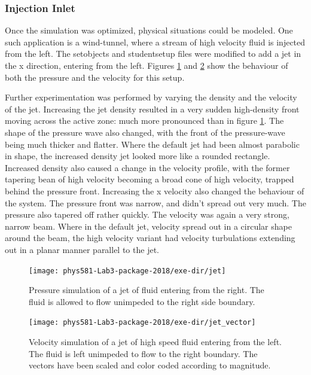 \documentclass[twocolumn]{article}
\begin{document}
\subsubsection{Injection Inlet}
Once the simulation was optimized, physical situations could be modeled. One such application is a wind-tunnel, where a stream of high velocity fluid is injected from the left. The setobjects and studentsetup files were modified to add a jet in the x direction, entering from the left. Figures \ref{fig:jet} and \ref{fig:jet_vector} show the behaviour of both the pressure and the velocity for this setup. 

Further experimentation was performed by varying the density and the velocity of the jet. Increasing the jet density resulted in a very sudden high-density front moving across the active zone: much more pronounced than in figure \ref{fig:jet}. The shape of the pressure wave also changed, with the front of the pressure-wave being much thicker and flatter. Where the default jet had been almost parabolic in shape, the increased density jet looked more like a rounded rectangle. Increased density also caused a change in the velocity profile, with the former tapering bean of high velocity becoming a broad cone of high velocity, trapped behind the pressure front. Increasing the x velocity also changed the behaviour of the system. The pressure front was narrow, and didn't spread out very much. The pressure also tapered off rather quickly. The velocity was again a very strong, narrow beam. Where in the default jet, velocity spread out in a circular shape around the beam, the high velocity variant had velocity turbulations extending out in a planar manner parallel to the jet.

\begin{figure}
\centering
\texttt{[image: phys581-Lab3-package-2018/exe-dir/jet]}
\caption{Pressure simulation of a jet of fluid entering from the right. The fluid is allowed to flow unimpeded to the right side boundary.}
\label{fig:jet}
\end{figure}

\begin{figure}
\centering
\texttt{[image: phys581-Lab3-package-2018/exe-dir/jet\_vector]}
\caption{Velocity simulation of a jet of high speed fluid entering from the left. The fluid is left unimpeded to flow to the right boundary. The vectors have been scaled and color coded according to magnitude.}
\label{fig:jet_vector}
\end{figure}
\end{document}
